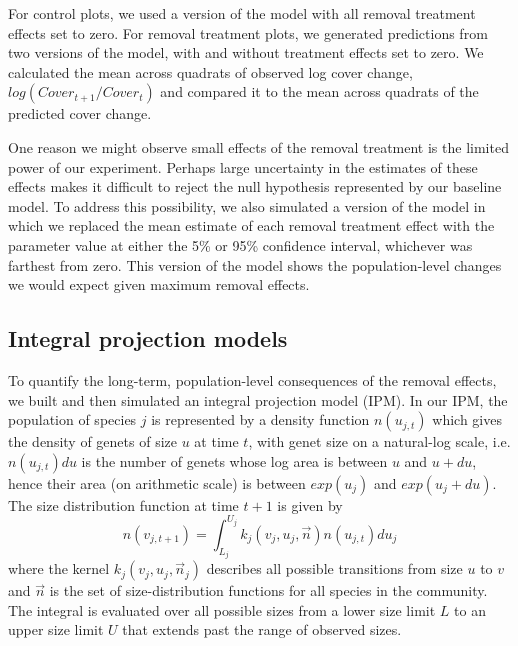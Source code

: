 \documentclass[11pt]{article}
\begin{document}
\begin{doublespacing}
For control plots, we used a version of the model with all removal treatment effects set to zero. For removal treatment plots, we generated predictions from two versions of the model, with and without treatment effects set to zero.  We calculated the mean across quadrats of observed log cover change, $log(Cover_{t+1}/Cover_t)$ and compared it to the mean across quadrats of the predicted cover change.

One reason we might observe small effects of the removal treatment is the limited power of our experiment. Perhaps large uncertainty in the estimates of these effects makes it difficult to reject the null hypothesis represented by our baseline model. To address this possibility, we also simulated a version of the model in which we replaced the mean estimate of each removal treatment effect with the parameter value at either the 5\% or 95\% confidence interval, whichever was farthest from zero. This version of the model shows the population-level changes we would expect given maximum removal effects.

\subsection*{Integral projection models}

To quantify the long-term, population-level consequences of the removal effects, we built and then simulated an integral projection model (IPM). In our IPM, the population of species $j$ is represented by a density function $n(u_{j,t})$ which gives the density of genets of size $u$ at time $t$, with genet size on a natural-log scale, i.e. $n(u_{j,t})du$ is the number of genets whose log area is between $u$ and $u+du$, hence their area 
(on arithmetic scale) is between $exp(u_j)$ and $exp(u_j+du)$. The size distribution function at time $t+1$ is given by
\begin{equation}
n(v_{j,t+1})=\int_{L_j}^{U_j} k_j (v_j,u_j,{\vec{n}})n(u_{j,t})du_j   
\label{eqn:IPM}
\end{equation}
where the kernel $k_j (v_j,u_j,\vec{n}_j)$ describes all possible transitions from size $u$ to $v$ and $\vec{n}$ 
is the set of size-distribution functions for all species in the community. The integral is evaluated over all possible sizes from a 
lower size limit $L$ to an upper size limit $U$ that extends past the range of observed sizes.   


\end{doublespacing}
\end{document}
